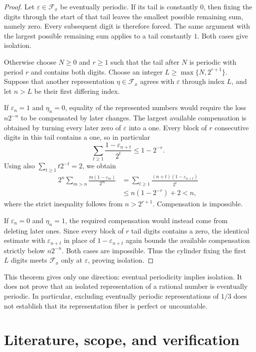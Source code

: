 \documentclass[11pt]{article}
\theoremstyle{definition}
\theoremstyle{remark}
\begin{document}
\begin{proof}
Let $\varepsilon\in\mathcal F_x$ be eventually periodic.  If its tail
is constantly $0$, then fixing the digits through the start of that
tail leaves the smallest possible remaining sum, namely zero.
Every subsequent digit is therefore forced.  The same argument with
the largest possible remaining sum applies to a tail constantly $1$.
Both cases give isolation.

Otherwise choose $N\geq0$ and $r\geq1$ such that the tail after $N$
is periodic with period $r$ and contains both digits.  Choose an integer
$L\geq\max\{N,2^{r+1}\}$.  Suppose that another representation
$\eta\in\mathcal F_x$ agrees with $\varepsilon$ through index $L$,
and let $n>L$ be their first differing index.

If $\varepsilon_n=1$ and $\eta_n=0$, equality of the represented
numbers would require the loss $n2^{-n}$ to be compensated by later
changes.  The largest available compensation is obtained by turning
every later zero of $\varepsilon$ into a one.  Every block of $r$
consecutive digits in this tail contains a one, so in particular
\[
 \sum_{t\geq1}\frac{1-\varepsilon_{n+t}}{2^t}
 \leq 1-2^{-r}.
\]
Using also $\sum_{t\geq1}t2^{-t}=2$, we obtain
\[
 \begin{split}
 2^n\sum_{m>n}\frac{m(1-\varepsilon_m)}{2^m}
 &=\sum_{t\geq1}\frac{(n+t)(1-\varepsilon_{n+t})}{2^t}\\
 &\leq n(1-2^{-r})+2<n,
 \end{split}
\]
where the strict inequality follows from $n>2^{r+1}$.  Compensation
is impossible.

If $\varepsilon_n=0$ and $\eta_n=1$, the required compensation would
instead come from deleting later ones.  Since every block of $r$
tail digits contains a zero, the identical estimate with
$\varepsilon_{n+t}$ in place of $1-\varepsilon_{n+t}$ again bounds
the available compensation strictly below $n2^{-n}$.
Both cases are impossible.  Thus the cylinder fixing the first $L$
digits meets $\mathcal F_x$ only at $\varepsilon$, proving isolation.
\end{proof}

This theorem gives only one direction: eventual periodicity implies
isolation.  It does not prove that an isolated representation of a
rational number is eventually periodic.  In particular, excluding
eventually periodic representations of $1/3$ does not establish that
its representation fiber is perfect or uncountable.

\section{Literature, scope, and verification}
\end{document}
